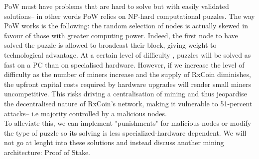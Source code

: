PoW must have problems that are hard to solve but with easily validated  solutions– in other words PoW relies on NP-hard computational puzzles.
The way PoW works is the following: the random selection of nodes is actually skewed in favour of those with greater computing power. Indeed, the first node to have solved the puzzle is allowed to broadcast their block, giving weight to technological advantage. At a certain level of difficulty , puzzles will be solved as fast on a PC than on specialised hardware. However, if we increase the level of difficulty as the number of miners increase and the supply of RxCoin diminishes, the upfront capital costs required by hardware upgrades will render small miners uncompetitive. This risks driving a centralisation of mining and thus jeopardise the decentralised nature of RxCoin's network, making it vulnerable to 51-percent attacks– i.e majority controlled by a malicious nodes.\\

To alleviate this, we can implement "punishments" for malicious nodes or modify the type of puzzle so its solving is less specialized-hardware dependent. We will not go at lenght into these solutions and instead discuss another mining architecture: Proof of Stake.\\
